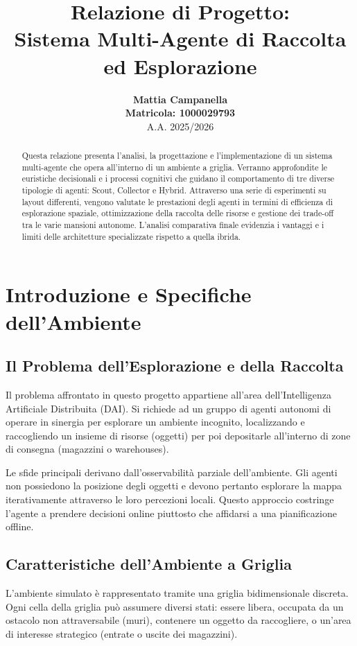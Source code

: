 \documentclass[12pt,a4paper]{report}
\title{\Huge\bfseries Relazione di Progetto: \\ Sistema Multi-Agente di Raccolta ed Esplorazione}
\author{\textbf{Mattia Campanella} \\ \textbf{Matricola: 1000029793} \\[1em] A.A. 2025/2026}
\date{}
\begin{document}
\maketitle

\begin{abstract}
Questa relazione presenta l'analisi, la progettazione e l'implementazione di un sistema multi-agente che opera all'interno di un ambiente a griglia. Verranno approfondite le euristiche decisionali e i processi cognitivi che guidano il comportamento di tre diverse tipologie di agenti: Scout, Collector e Hybrid. Attraverso una serie di esperimenti su layout differenti, vengono valutate le prestazioni degli agenti in termini di efficienza di esplorazione spaziale, ottimizzazione della raccolta delle risorse e gestione dei trade-off tra le varie mansioni autonome. L'analisi comparativa finale evidenzia i vantaggi e i limiti delle architetture specializzate rispetto a quella ibrida.
\end{abstract}

\tableofcontents
\newpage

\chapter{Introduzione e Specifiche dell'Ambiente}
\section{Il Problema dell'Esplorazione e della Raccolta}
Il problema affrontato in questo progetto appartiene all'area dell'Intelligenza Artificiale Distribuita (DAI). Si richiede ad un gruppo di agenti autonomi di operare in sinergia per esplorare un ambiente incognito, localizzando e raccogliendo un insieme di risorse (oggetti) per poi depositarle all'interno di zone di consegna (magazzini o warehouses). 

Le sfide principali derivano dall'osservabilità parziale dell'ambiente. Gli agenti non possiedono la posizione degli oggetti e devono pertanto esplorare la mappa iterativamente attraverso le loro percezioni locali. Questo approccio costringe l'agente a prendere decisioni online piuttosto che affidarsi a una pianificazione offline.

\section{Caratteristiche dell'Ambiente a Griglia}
L'ambiente simulato è rappresentato tramite una griglia bidimensionale discreta. Ogni cella della griglia può assumere diversi stati: essere libera, occupata da un ostacolo non attraversabile (muri), contenere un oggetto da raccogliere, o un'area di interesse strategico (entrate o uscite dei magazzini). 
\end{document}
